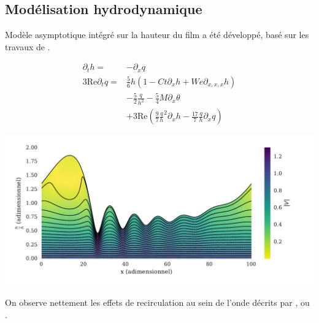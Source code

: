 \documentclass[a0,portrait]{a0poster}
\begin{document}
\begin{multicols}{2}
    \subsection*{Modélisation hydrodynamique}
    Modèle asymptotique intégré sur la hauteur du film a été développé, basé sur les travaux de \textcite{Ruyer-Quil2000}.

    \begin{multicols}{2}
        \begin{align*}
            \partial_t h =& -\partial_x q\\
            3 \mathrm{Re} \partial_t q =& \frac{5}{6} h
                \left(
                    1 - Ct \partial_x h + We \partial_{x,x,x} h
                \right)\\
            & - \frac{5}{2}\frac{q}{h^2}
            - \frac{5}{4} M \partial_x \theta \\
            & + 3 \mathrm{Re}
                \left(
                    \frac{9}{7}\frac{q}{h}^2 \partial_x h - \frac{17}{7}\frac{q}{h} \partial_x q
                \right)
        \end{align*}
        \columnbreak
        \begin{center}\vspace{.5cm}
            \includegraphics[width=0.95\columnwidth]{01-established_wave_streamlines}
            \label{fig:streamlines}
        \end{center}\vspace{.5cm}
    \end{multicols}

    On observe nettement les effets de recirculation au sein de l'onde décrits par \textcite{Brauner1989}, \textcite{Yoshimura1996} ou \textcite{Miyara1999}.


\end{multicols}
\end{document}
